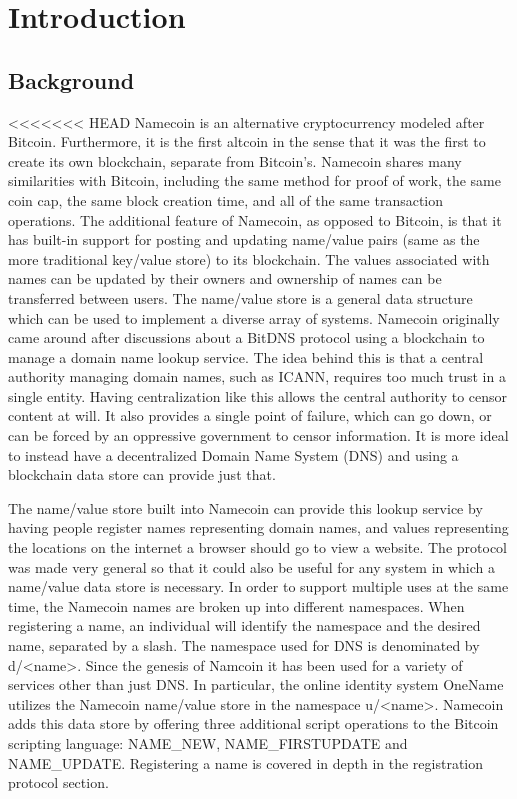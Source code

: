 \section{Introduction}
\label{sec:intro}

\subsection{Background}
<<<<<<< HEAD
Namecoin is an alternative cryptocurrency modeled after Bitcoin. Furthermore, it is the first altcoin in the sense that it was the first to create its own blockchain, separate from Bitcoin's. Namecoin shares many similarities with Bitcoin, including the same method for proof of work, the same coin cap, the same block creation time, and all of the same transaction operations. The additional feature of Namecoin, as opposed to Bitcoin, is that it has built-in support for posting and updating name/value pairs (same as the more traditional key/value store) to its blockchain. The values associated with names can be updated by their owners and ownership of names can be transferred between users. The name/value store is a general data structure which can be used to implement a diverse array of systems. Namecoin originally came around after discussions about a BitDNS protocol using a blockchain to manage a domain name lookup service. The idea behind this is that a central authority managing domain names, such as ICANN, requires too much trust in a single entity. Having centralization like this allows the central authority to censor content at will. It also provides a single point of failure, which can go down, or can be forced by an oppressive government to censor information. It is more ideal to instead have a decentralized Domain Name System (DNS) and using a blockchain data store can provide just that.

The name/value store built into Namecoin can provide this lookup service by having people register names representing domain names, and values representing the locations on the internet a browser should go to view a website. The protocol was made very general so that it could also be useful for any system in which a name/value data store is necessary. In order to support multiple uses at the same time, the Namecoin names are broken up into different namespaces. When registering a name, an individual will identify the namespace and the desired name, separated by a slash. The namespace used for DNS is denominated by d/<name>. Since the genesis of Namcoin it has been used for a variety of services other than just DNS. In particular, the online identity system OneName utilizes the Namecoin name/value store in the namespace u/<name>. Namecoin adds this data store by offering three additional script operations to the Bitcoin scripting language: NAME\_NEW, NAME\_FIRSTUPDATE and NAME\_UPDATE. Registering a name is covered in depth in the registration protocol section. 

